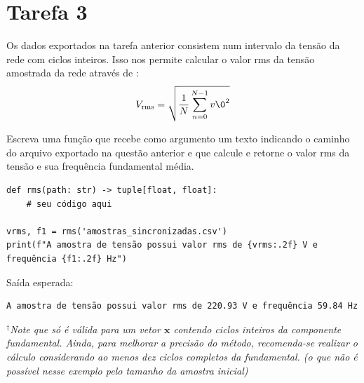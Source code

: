 \section*{Tarefa 3}
Os dados exportados na tarefa anterior consistem num intervalo da tensão da rede com ciclos inteiros.
Isso nos permite calcular o valor rms da tensão amostrada da rede através de :
\begin{equation}\label{eq:rms}
V_{\text{rms}} = \sqrt{\dfrac{1}{N} \sum_ {n=0} ^{N-1} v\0 ^2}
\end{equation}

Escreva uma função   que recebe como argumento um texto indicando o caminho
do arquivo exportado na questão anterior e que calcule e retorne o valor rms da tensão e sua frequência fundamental média.
\begin{verbatim}
def rms(path: str) -> tuple[float, float]:
    # seu código aqui

vrms, f1 = rms('amostras_sincronizadas.csv')
print(f"A amostra de tensão possui valor rms de {vrms:.2f} V e frequência {f1:.2f} Hz")
\end{verbatim}

Saída esperada:
\begin{verbatim}
A amostra de tensão possui valor rms de 220.93 V e frequência 59.84 Hz
\end{verbatim}

$^\dagger$\emph{Note que  só é válida para um vetor $\mathbf{x}$ contendo ciclos inteiros da componente fundamental.
Ainda, para melhorar a precisão do método, recomenda-se realizar o cálculo considerando ao menos dez ciclos completos da fundamental.
    (o que não é possível nesse exemplo pelo tamanho da amostra inicial)}


